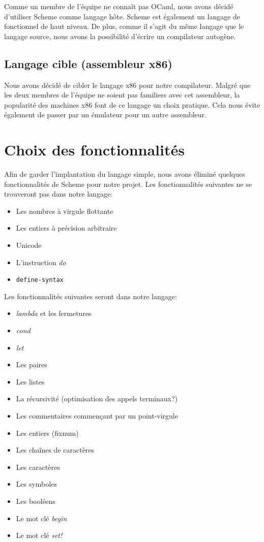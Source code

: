 \documentclass[11pt]{article}
\begin{document}
Comme un membre de l'équipe ne connaît pas OCaml, nous avons décidé
d'utiliser Scheme comme langage hôte.  Scheme est également un langage
de fonctionnel de haut niveau.  De plus, comme il s'agit du même
langage que le langage source, nous avons la possibilité d'écrire un
compilateur autogène.


\subsection{Langage cible (assembleur x86)}

Nous avons décidé de cibler le langage x86 pour notre compilateur.
Malgré que les deux membres de l'équipe ne soient pas familiers avec
cet assembleur, la popularité des machines x86 font de ce langage un
choix pratique.  Cela nous évite également de passer par un émulateur
pour un autre assembleur.


\section{Choix des fonctionnalités}

Afin de garder l'implantation du langage simple, nous avons éliminé
quelques fonctionnalités de Scheme pour notre projet.  Les
fonctionnalités suivantes ne se trouveront pas dans notre langage:


\begin{itemize}
\item Les nombres à virgule flottante
\item Les entiers à précision arbitraire
\item Unicode
\item L'instruction \emph{do}
\item \texttt{define-syntax}
\end{itemize}

Les fonctionnalités suivantes seront dans notre langage:


\begin{itemize}
\item \emph{lambda} et les fermetures
\item \emph{cond}
\item \emph{let}
\item Les paires
\item Les listes
\item La récursivité (optimisation des appels terminaux?)
\item Les commentaires commençant par un point-virgule
\item Les entiers (fixnum)
\item Les chaînes de caractères
\item Les caractères
\item Les symboles
\item Les booléens
\item Le mot clé \emph{begin}
\item Le mot clé \emph{set!}
\end{itemize}
\end{document}
